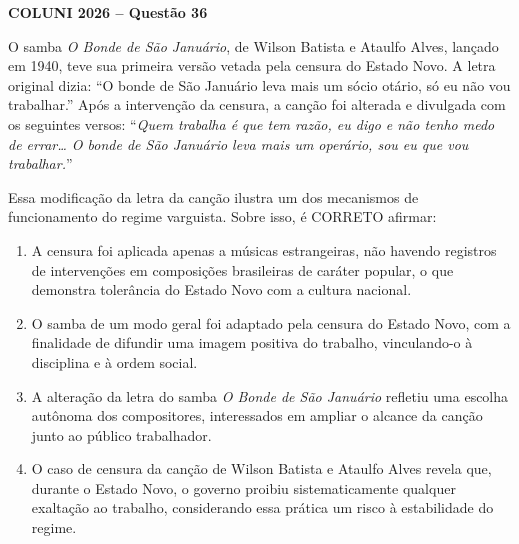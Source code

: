 \textbf{COLUNI 2026 -- Questão 36}\par\medskip O samba \textit{O Bonde de São Januário}, de Wilson Batista e Ataulfo Alves, lançado em 1940, teve sua primeira versão vetada pela censura do Estado Novo. A letra original dizia: “O bonde de São Januário leva mais um sócio otário, só eu não vou trabalhar.” Após a intervenção da censura, a canção foi alterada e divulgada com os seguintes versos: “\textit{Quem trabalha é que tem razão, eu digo e não tenho medo de errar… O bonde de São Januário leva mais um operário, sou eu que vou trabalhar.}”

Essa modificação da letra da canção ilustra um dos mecanismos de funcionamento do regime varguista. Sobre isso, é CORRETO afirmar:\begin{enumerate}
\item A censura foi aplicada apenas a músicas estrangeiras, não havendo registros de intervenções em composições brasileiras de caráter popular, o que demonstra tolerância do Estado Novo com a cultura nacional.
\item O samba de um modo geral foi adaptado pela censura do Estado Novo, com a finalidade de difundir uma imagem positiva do trabalho, vinculando-o à disciplina e à ordem social.
\item A alteração da letra do samba \textit{O Bonde de São Januário} refletiu uma escolha autônoma dos compositores, interessados em ampliar o alcance da canção junto ao público trabalhador.
\item O caso de censura da canção de Wilson Batista e Ataulfo Alves revela que, durante o Estado Novo, o governo proibiu sistematicamente qualquer exaltação ao trabalho, considerando essa prática um risco à estabilidade do regime.\end{enumerate}